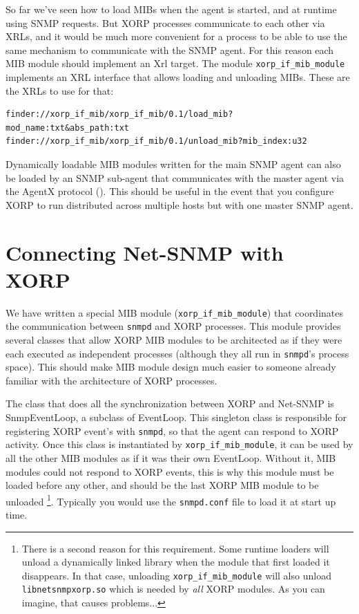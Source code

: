 \documentclass[11pt]{article}
\begin{document}
So far we've seen how to load MIBs when the agent is started, and at runtime
using SNMP requests.  But XORP processes communicate to each other via XRLs,
and it would be much more convenient for a process to be able to use the same
mechanism to communicate with the SNMP agent.  For this reason each MIB module
should implement an Xrl target.  The module \texttt{xorp\_if\_mib\_module}
implements an XRL interface that allows loading and unloading MIBs.  These are
the XRLs to use for that: 

\begin{ttfamily}
\begin{verbatim}
finder://xorp_if_mib/xorp_if_mib/0.1/load_mib?mod_name:txt&abs_path:txt
finder://xorp_if_mib/xorp_if_mib/0.1/unload_mib?mib_index:u32
\end{verbatim}
\end{ttfamily}

Dynamically loadable MIB modules written for the main SNMP agent can also be
loaded by an SNMP sub-agent that communicates with the master agent via the
AgentX protocol (\cite{AgentX}).  This should be useful in the event that you
configure XORP to run distributed across multiple hosts but with one 
master SNMP agent.  


\section{Connecting Net-SNMP with XORP}

We have written a special MIB module (\texttt{xorp\_if\_mib\_module}) that
coordinates the communication between \texttt{snmpd} and XORP processes.  This
module provides several classes that allow XORP MIB modules to be architected
as if they were each executed as independent processes (although they all run
in \texttt{snmpd}'s process space).  This should make MIB module design much
easier to someone already familiar with the architecture of XORP processes.
 
The class that does all the synchronization between XORP and Net-SNMP 
is SnmpEventLoop, a subclass of EventLoop.  This singleton class is
responsible for registering XORP event's with \texttt{snmpd}, so that the agent
can respond to XORP activity.  Once this class is instantiated by
\texttt{xorp\_if\_mib\_module}, it can be used by all the other MIB modules as
if it was their own EventLoop.  Without it, MIB modules could not respond to
XORP events, this is why this module must be loaded before any other, and
should be the last XORP MIB module to be unloaded \footnote{There is a second
reason for this requirement.  Some runtime loaders will unload a dynamically
linked library when the module that first loaded it disappears.  In that case,
unloading \texttt{xorp\_if\_mib\_module} will also unload
\texttt{libnetsnmpxorp.so} which is needed by \emph{all} XORP modules.  As you
can imagine, that causes problems...}.  Typically you would use the
\texttt{snmpd.conf} file to load it at start up time.  
\end{document}
